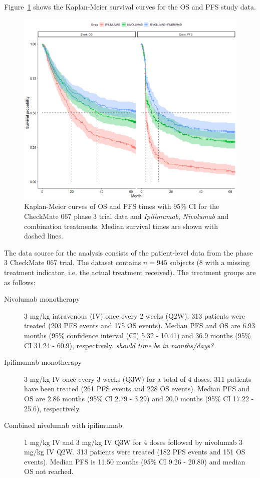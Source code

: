 \documentclass[AMA,STIX1COL]{WileyNJD-v2}
\begin{document}
Figure~\ref{fig:S_raw_data} shows the Kaplan-Meier survival curves for the OS and PFS study data.

\begin{figure}[!HtH]
\centering
\includegraphics[width=0.6\linewidth]{S_raw_data_with_CI.png}
\caption{\label{fig:S_raw_data} Kaplan-Meier curves of OS and PFS times with 95\% CI for the CheckMate 067 phase 3 trial data and {\it Ipilimumab}, {\it Nivolumab} and combination treatments.
Median survival times are shown with dashed lines.}
\end{figure}

The data source for the analysis consists of the patient-level data from the phase 3 CheckMate 067 trial\citep{Wolchok2017, Larkin2019}.
The dataset contains $n = 945$ subjects (8 with a missing treatment indicator, i.e. the actual treatment received).
The treatment groups are as follows:
\begin{description}
\item[Nivolumab monotherapy] 3 mg/kg intravenous (IV) once every 2 weeks (Q2W). 313 patients were treated (203 PFS events and 175 OS events).
Median PFS and OS are 6.93 months (95\% confidence interval (CI) 5.32 - 10.41) and 36.9 months (95\% CI 31.24 - 60.9), respectively. {\it should time be in months/days?}
\item[Ipilimumab monotherapy] 3 mg/kg IV once every 3 weeks (Q3W) for a total of 4 doses.
311 patients have been treated (261 PFS events and 228 OS events). Median PFS and OS are 2.86 months (95\% CI 2.79 - 3.29) and 20.0 months (95\% CI 17.22 - 25.6), respectively.
\item[Combined nivolumab with ipilimumab] 1 mg/kg IV and 3 mg/kg IV Q3W for 4 doses followed by nivolumab 3 mg/kg IV Q2W.
313 patients were treated (182 PFS events and 151 OS events). Median PFS is 11.50 months (95\% CI 9.26 - 20.80) and median OS not reached. 
\end{description}
\end{document}
